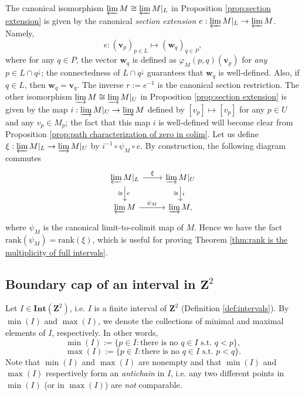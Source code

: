 \documentclass[11pt]{article}
\theoremstyle{definition}
\newcommand{\bv}{\mathbf{v}}
\newcommand{\bw}{\mathbf{w}}
\newcommand{\rank}{\mathrm{rank}}
\newcommand{\Int}{\mathbf{Int}}
\newcommand{\Z}{\mathbf{Z}}
\begin{document}
The canonical isomorphism $\varprojlim M \cong \varprojlim M|_{L}$ in Proposition \ref{prop:section extension} is given by the canonical \emph{section extension} $e:\varprojlim M|_{L} \rightarrow \varprojlim M$. Namely,
\begin{equation}\label{eq:section extension}
    e: (\bv_{p})_{p\in L}\mapsto (\bw_{q})_{q\in P },
\end{equation}
where for any $q\in P$, the vector $\bw_q$ is defined as $\varphi_M(p,q)(\bv_p)$ for \emph{any} $p\in L\cap q^{\downarrow}$; the connectedness of $L\cap q^{\downarrow}$ guarantees that $\bw_q$ is well-defined. Also, if $q\in L$, then $\bw_q=\bv_q$. The inverse $r:=e^{-1}$ is the canonical section restriction. The other isomorphism $\varinjlim M \cong \varinjlim M|_{U}$ in Proposition \ref{prop:section extension} is given by the map $i:\varinjlim M|_U\rightarrow \varinjlim M$ defined by $[v_p]\mapsto [v_p]$ for any $p\in U$ and any $v_p\in M_p$; the fact that this map $i$ is well-defined will become clear from Proposition \ref{prop:path characterization of zero in colim}. Let us define $\xi: \varprojlim M|_{L} \rightarrow \varinjlim M|_{U}$ by $i^{-1}\circ \psi_M\circ e$. By construction, the following diagram commutes
\begin{equation}\label{eq:diagram commutes}
\begin{tikzcd}
\varprojlim M|_{L} \arrow{r}{\xi} \arrow[d, "e", "\cong"']
&\varinjlim M|_{U} \arrow[d,"i","\cong"']\\
\varprojlim M \arrow{r}{\psi_M} &\varinjlim M,
\end{tikzcd}
\end{equation}
where $\psi_M$ is the canonical limit-to-colimit map of $M$. Hence we have the fact $\rank(\psi_M)=\rank(\xi)$, which is useful for proving Theorem \ref{thm:rank is the multiplicity of full intervals}.

\subsection{Boundary cap of an interval in $\Z^2$}\label{sec:boundary cap}

Let $I\in \Int(\Z^2)$, i.e. $I$ is a finite interval of $\Z^2$ (Definition \ref{def:intervals}). By $\min (I)$ and $\max (I)$, we denote the collections of minimal and maximal elements of $I$, respectively. In other words,
\[\min (I):=\{p\in I: \mbox{there is no $q\in I$ s.t. $q<p$}\},\] \[ \max (I):=\{p\in I: \mbox{there is no $q\in I$ s.t. $p<q$}\}.
\]
Note that $\min (I)$ and $\max(I)$ are nonempty and that $\min (I)$ and $\max (I)$ respectively form an \emph{antichain} in $I$, i.e. any two different points in $\min (I)$ (or in $\max (I)$) are \emph{not} comparable.  
\end{document}
